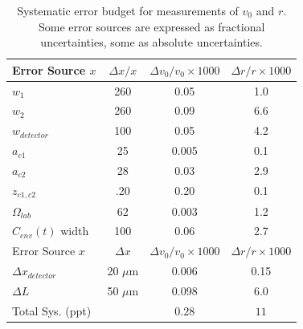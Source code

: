\documentclass[twocolumn, prl,showpacs,superscriptaddress]{revtex4-1}   %
\newcommand{\sigv}{0.28}
\newcommand{\sigr}{11}
\begin{document}
\begingroup
\begin{table}
\caption{\label{tableVelError}Systematic error budget for measurements of $v_0$ and $r$. Some error sources are expressed as fractional uncertainties, some as absolute uncertainties.}
\begin{center}
\begin{tabular}{l c c c}
\hline\hline
Error Source $x$ & $\Delta x/x$ & $\Delta v_0/v_0 \times 1000$ & $\Delta r/r \times 1000$ \\
\hline
$w_1$ & 260 & 0.05 & 1.0 \\
$w_2$ & 260 & 0.09 & 6.6 \\
$w_{detector}$ & 100 & 0.05 & 4.2 \\
$a_{c1}$ & 25 & 0.005 & 0.1 \\
$a_{c2}$ & 28 & 0.03 & 2.9 \\
$z_{c1,c2}$ & .20 & 0.20 & 0.1 \\
$\Omega_{lab}$ & 62 & 0.003 & 1.2 \\
$C_{env}(t)$ width & 100 & 0.06 & 2.7 \\
\hline
Error Source $x$ & $\Delta x$ & $\Delta v_0/v_0 \times 1000$ & $\Delta r/r \times 1000$ \\
\hline
$\Delta x_{detector}$ & 20 $\mu$m & 0.006 & 0.15 \\
$\Delta L$ & 50 $\mu$m & 0.098 & 6.0 \\
\hline
Total Sys. (ppt) & & $\sigv$ & $\sigr$ \\
\hline\hline
\end{tabular}
\end{center}
\end{table}
\endgroup
\end{document}

